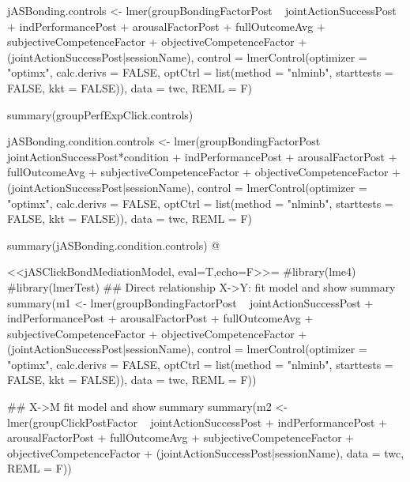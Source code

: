 jASBonding.controls <- lmer(groupBondingFactorPost ~ jointActionSuccessPost +
                            indPerformancePost + arousalFactorPost + fullOutcomeAvg +
                            subjectiveCompetenceFactor + objectiveCompetenceFactor +
                            (jointActionSuccessPost|sessionName),
                            control = lmerControl(optimizer = "optimx", calc.derivs = FALSE, optCtrl = list(method = "nlminb", starttests = FALSE, kkt = FALSE)),
                            data = twc,
                            REML = F)

summary(groupPerfExpClick.controls)

jASBonding.condition.controls <- lmer(groupBondingFactorPost ~
                            jointActionSuccessPost*condition +
                            indPerformancePost + arousalFactorPost + fullOutcomeAvg +
                            subjectiveCompetenceFactor + objectiveCompetenceFactor +
                            (jointActionSuccessPost|sessionName),
                            control = lmerControl(optimizer = "optimx", calc.derivs = FALSE, optCtrl = list(method = "nlminb", starttests = FALSE, kkt = FALSE)),
                            data = twc,
                            REML = F)

summary(jASBonding.condition.controls)
@





<<jASClickBondMediationModel, eval=T,echo=F>>=
#library(lme4)
#library(lmerTest)
## Direct relationship X->Y: fit model and show summary
summary(m1 <- lmer(groupBondingFactorPost ~ jointActionSuccessPost +
                            indPerformancePost + arousalFactorPost + fullOutcomeAvg +
                            subjectiveCompetenceFactor + objectiveCompetenceFactor +
                            (jointActionSuccessPost|sessionName),
                            control = lmerControl(optimizer = "optimx", calc.derivs = FALSE, optCtrl = list(method = "nlminb", starttests = FALSE, kkt = FALSE)),
                            data = twc,
                            REML = F))

## X->M fit model and show summary
summary(m2 <- lmer(groupClickPostFactor ~ jointActionSuccessPost +
                                          indPerformancePost + arousalFactorPost + fullOutcomeAvg +
                                          subjectiveCompetenceFactor + objectiveCompetenceFactor +
                                          (jointActionSuccessPost|sessionName),
                                          data = twc,
                                          REML = F))

